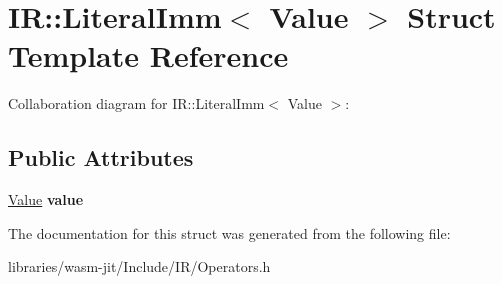 \hypertarget{struct_i_r_1_1_literal_imm}{}\section{IR\+:\+:Literal\+Imm$<$ Value $>$ Struct Template Reference}
\label{struct_i_r_1_1_literal_imm}


Collaboration diagram for IR\+:\+:Literal\+Imm$<$ Value $>$\+:
\subsection*{Public Attributes}
\begin{DoxyCompactItemize}
\item 
\mbox{\label{struct_i_r_1_1_literal_imm_a9b796ec65d16af24f33ed01887df92ca}} 
\mbox{\hyperlink{struct_value}{Value}} {\bfseries value}
\end{DoxyCompactItemize}


The documentation for this struct was generated from the following file\+:\begin{DoxyCompactItemize}
\item 
libraries/wasm-\/jit/\+Include/\+I\+R/Operators.\+h\end{DoxyCompactItemize}
